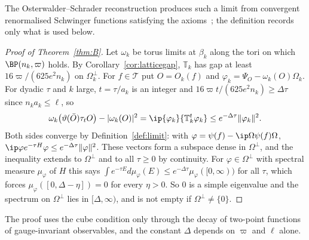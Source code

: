The Osterwalder--Schrader reconstruction produces such a limit from
convergent renormalised Schwinger functions satisfying the
axioms~\cite{OS73,OS75}; the definition records only what is used below.

\begin{proof}[Proof of Theorem~\ref{thm:B}]
Let $\omega_k$ be torus limits at $\beta_k$ along the tori on which
$\BP(n_k,\varpi)$ holds. By Corollary~\ref{cor:latticegap}, $\mathbb T_k$ has gap
at least $16\varpi/(625e^2n_k)$ on $\Omega_k^\perp$. For $f\in\mathcal T$ put
$O=O_k(f)$ and $\varphi_k=\Psi_O-\omega_k(O)\Omega_k$. For dyadic $\tau$ and $k$
large, $t=\tau/a_k$ is an integer and $16\varpi t/(625e^2n_k)\ge\Delta\tau$ since
$n_ka_k\le\ell$, so
\[
\omega_k\bigl(\vartheta(\bar O)\tau_tO\bigr)-|\omega_k(O)|^2=\ip{\varphi_k}{\mathbb T_k^t
\varphi_k}\le e^{-\Delta\tau}\|\varphi_k\|^2 .
\]
Both sides converge by Definition~\ref{def:limit}: with $\varphi=\psi(f)-\ip\Omega
{\psi(f)}\Omega$, $\ip\varphi{e^{-\tau H}\varphi}\le e^{-\Delta\tau}\|\varphi\|^2$. These
vectors form a subspace dense in $\Omega^\perp$, and the inequality extends to
$\Omega^\perp$ and to all $\tau\ge0$ by continuity. For $\varphi\in\Omega^\perp$ with
spectral measure $\mu_\varphi$ of $H$ this says $\int e^{-\tau E}d\mu_\varphi(E)\le e^{-\Delta
\tau}\mu_\varphi([0,\infty))$ for all $\tau$, which forces $\mu_\varphi([0,\Delta-\eta])=0$
for every $\eta>0$. So $0$ is a simple eigenvalue and the spectrum on
$\Omega^\perp$ lies in $[\Delta,\infty)$, and is not empty if $\Omega^\perp\ne\{0\}$.
\end{proof}

The proof uses the cube condition only through the decay of two-point
functions of gauge-invariant observables, and the constant $\Delta$ depends on
$\varpi$ and $\ell$ alone.
